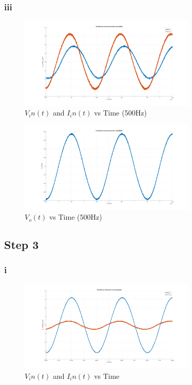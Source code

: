 \documentclass[letterpaper,12pt]{article}
\begin{document}
\subsubsection{iii}
\begin{figure}[H]
    \centering
    \includegraphics[width = 0.75\textwidth]{2_3_1.png}
    \caption{\(V_in(t) \) and \(I_in(t)\) vs Time (500Hz)}
\end{figure} 

\begin{figure}[H]
    \centering
    \includegraphics[width = 0.75\textwidth]{2_3_2.png}
    \caption{\(V_o(t) \) vs Time (500Hz)}
\end{figure} 
%
\subsection{Step 3}

\subsubsection{i}

\begin{figure}[H]
    \centering
    \includegraphics[width = 0.75\textwidth]{3_1.png}
    \caption{\(V_in(t) \) and \(I_in(t)\) vs Time }
\end{figure} 
\end{document}
